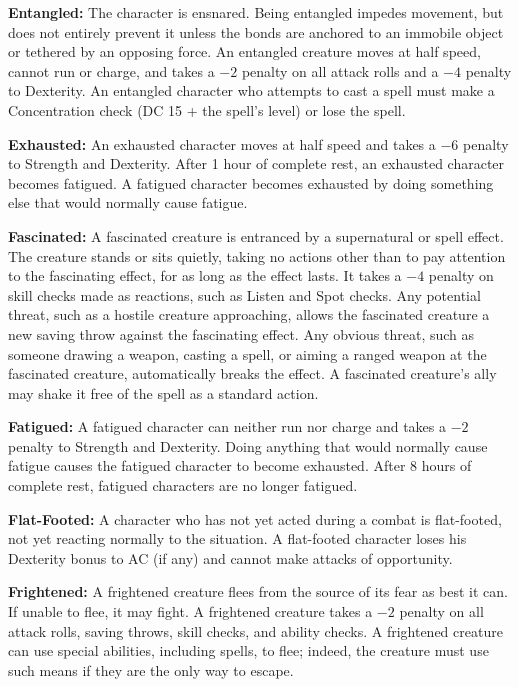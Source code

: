\textbf{Entangled:} The character is ensnared. Being entangled impedes movement, but does not entirely prevent it unless the bonds are anchored to an immobile object or tethered by an opposing force. An entangled creature moves at half speed, cannot run or charge, and takes a $-2$ penalty on all attack rolls and a $-4$ penalty to Dexterity. An entangled character who attempts to cast a spell must make a Concentration check (DC 15 + the spell's level) or lose the spell.

\textbf{Exhausted:} An exhausted character moves at half speed and takes a $-6$ penalty to Strength and Dexterity. After 1 hour of complete rest, an exhausted character becomes fatigued. A fatigued character becomes exhausted by doing something else that would normally cause fatigue.

\textbf{Fascinated:} A fascinated creature is entranced by a supernatural or spell effect. The creature stands or sits quietly, taking no actions other than to pay attention to the fascinating effect, for as long as the effect lasts. It takes a $-4$ penalty on skill checks made as reactions, such as Listen and Spot checks. Any potential threat, such as a hostile creature approaching, allows the fascinated creature a new saving throw against the fascinating effect. Any obvious threat, such as someone drawing a weapon, casting a spell, or aiming a ranged weapon at the fascinated creature, automatically breaks the effect. A fascinated creature's ally may shake it free of the spell as a standard action.

\textbf{Fatigued:} A fatigued character can neither run nor charge and takes a $-2$ penalty to Strength and Dexterity. Doing anything that would normally cause fatigue causes the fatigued character to become exhausted. After 8 hours of complete rest, fatigued characters are no longer fatigued.

\textbf{Flat-Footed:} A character who has not yet acted during a combat is flat-footed, not yet reacting normally to the situation. A flat-footed character loses his Dexterity bonus to AC (if any) and cannot make attacks of opportunity.

\textbf{Frightened:} A frightened creature flees from the source of its fear as best it can. If unable to flee, it may fight. A frightened creature takes a $-2$ penalty on all attack rolls, saving throws, skill checks, and ability checks. A frightened creature can use special abilities, including spells, to flee; indeed, the creature must use such means if they are the only way to escape.

